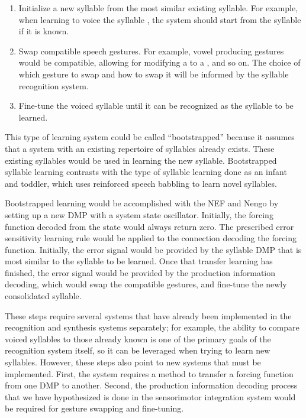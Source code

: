 \begin{enumerate}
\item Initialize a new syllable from the most
  similar existing syllable.
  For example, when learning to voice
  the syllable \ipa{[bA]}, the system should
  start from the syllable \ipa{[gA]} if it is known.
\item Swap compatible speech gestures.
  For example, vowel producing gestures
  would be compatible, allowing for modifying
  a \ipa{[bA]} to a \ipa{[bu]}, and so on.
  The choice of which gesture to swap and
  how to swap it will be informed by
  the syllable recognition system.
\item Fine-tune the voiced syllable
  until it can be recognized as the
  syllable to be learned.
\end{enumerate}

This type of learning system
could be called ``bootstrapped''
because it assumes that a system
with an existing repertoire of syllables
already exists.
These existing syllables would be
used in learning the new syllable.
Bootstrapped syllable learning contrasts with
the type of syllable learning
done as an infant and toddler,
which uses reinforced speech babbling
to learn novel syllables.

Bootstrapped learning
would be accomplished with the NEF and Nengo
by setting up a new DMP with a system state oscillator.
Initially, the forcing function decoded from the state
would always return zero.
The prescribed error sensitivity learning rule
\citep{macneil2011,bekolay2011}
would be applied to the
connection decoding the forcing function.
Initially, the error signal would be provided
by the syllable DMP that is most similar
to the syllable to be learned.
Once that transfer learning has finished,
the error signal would be provided by
the production information decoding,
which would swap the compatible gestures,
and fine-tune the newly consolidated syllable.

These steps require several systems
that have already been implemented
in the recognition and synthesis systems separately;
for example, the ability to compare
voiced syllables to those already known
is one of the primary goals
of the recognition system itself,
so it can be leveraged when trying to learn new syllables.
However, these steps also point to new systems
that must be implemented.
First, the system requires a method
to transfer a forcing function
from one DMP to another.
Second, the production information decoding process
that we have hypothesized is done
in the sensorimotor integration system
would be required for gesture swapping
and fine-tuning.

